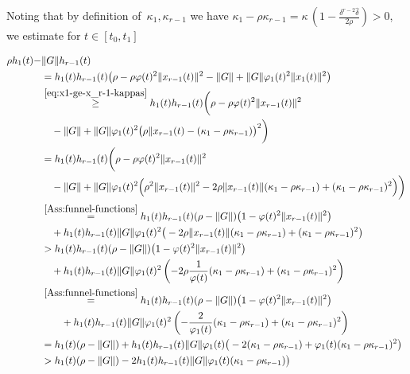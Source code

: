 \documentclass[ envcountsect, envcountsame]{svjour3}
\newcommand{\vp}{\varphi}
\begin{document}
%
%
Noting that by definition of~$\kappa_1,\kappa_{r-1}$ we have $\kappa_1 - \rho \kappa_{r-1} = \kappa \, \left(1 - \tfrac{\delta^{r-2} \hat \delta}{2 \rho} \right) > 0$, we estimate for $t \in [t_0,t_1]$ 
\begin{small}
\begin{align*}
\rho  h_1(t)  -  & \|G\| h_{r-1}(t)  \\
&= h_1(t) h_{r-1}(t) \big(\rho - \rho \vp(t)^2 \|x_{r-1}(t)\|^2 - \|G\| + \|G\| \vp_1(t)^2 \|x_1(t)\|^2 \big) \\
& \overset{\eqref{eq:x1-ge-x_r-1-kappas}}{\ge}
h_1(t) h_{r-1}(t) \bigg( \rho - \rho \vp(t)^2 \|x_{r-1}(t)\|^2 \\
&\quad - \|G\| + \|G\| \vp_1(t)^2 \big(\rho \|x_{r-1}(t) - (\kappa_1 - \rho  \kappa_{r-1}) \big)^2 \bigg) \\
&= h_1(t) h_{r-1}(t) \bigg( \rho - \rho \vp(t)^2 \|x_{r-1}(t)\|^2 \\
& \quad - \|G\| + 
\|G\| \vp_1(t)^2 \Big(\rho^2 \|x_{r-1}(t)\|^2 - 2\rho\|x_{r-1}(t)\|(\kappa_1 - \rho  \kappa_{r-1}) + (\kappa_1 - \rho  \kappa_{r-1})^2 \Big) \bigg) \\
& \overset{\rm \ref{Ass:funnel-functions}}{ =} h_1(t) h_{r-1}(t)( \rho - \|G\| ) \big( 1- \vp(t)^2 \|x_{r-1}(t)\|^2 \big) \\
& \quad + h_1(t) h_{r-1}(t) \|G\| \vp_1(t)^2 \big( - 2\rho\|x_{r-1}(t)\|(\kappa_1 - \rho  \kappa_{r-1}) + (\kappa_1 - \rho  \kappa_{r-1})^2 \big) \\
& > h_1(t) h_{r-1}(t)( \rho - \|G\| ) \big( 1- \vp(t)^2 \|x_{r-1}(t)\|^2 \big) \\
& \quad + h_1(t) h_{r-1}(t) \|G\| \vp_1(t)^2 \left( - 2 \rho \frac{1}{ \vp(t)} (\kappa_1 - \rho  \kappa_{r-1}) + (\kappa_1 - \rho  \kappa_{r-1})^2 \right) \\
& \overset{\rm \ref{Ass:funnel-functions}}{=} h_1(t) h_{r-1}(t)( \rho - \|G\| ) \big( 1- \vp(t)^2 \|x_{r-1}(t)\|^2 \big) \\
& \qquad + h_1(t) h_{r-1}(t) \|G\| \vp_1(t)^2 \left( -  \frac{2}{\vp_1(t)} (\kappa_1 - \rho  \kappa_{r-1}) + (\kappa_1 - \rho  \kappa_{r-1})^2 \right) \\
& = h_1(t) (\rho - \|G\| ) 
+  h_1(t) h_{r-1}(t) \|G\| \vp_1(t) \big(-2 (\kappa_1 - \rho  \kappa_{r-1}) + \vp_1(t) (\kappa_1 - \rho  \kappa_{r-1})^2 \big) \\
& > h_1(t) (\rho - \|G\| ) 
-2  h_1(t) h_{r-1}(t) \|G\| \vp_1(t) (\kappa_1 - \rho  \kappa_{r-1}) \big) \\

\end{align*}
\end{small}
\end{document}
